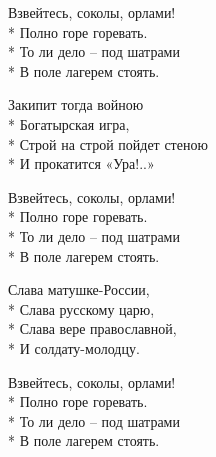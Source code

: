 \begin{minipage}{\linewidth}
\hspace*{1.5em}Взвейтесь, соколы, орлами!\\*
\hspace*{1.5em}Полно горе горевать.\\*
\hspace*{1.5em}То ли дело – под шатрами\\*
\hspace*{1.5em}В поле лагерем стоять.\\
\end{minipage}\par\medskip\nobreak

\medskip

\begin{minipage}{\linewidth}
Закипит тогда войною\\*
Богатырская игра,\\*
Строй на строй пойдет стеною\\*
И прокатится «Ура!..»\\
\end{minipage}\par\medskip\nobreak

\medskip

\begin{minipage}{\linewidth}
\hspace*{1.5em}Взвейтесь, соколы, орлами!\\*
\hspace*{1.5em}Полно горе горевать.\\*
\hspace*{1.5em}То ли дело – под шатрами\\*
\hspace*{1.5em}В поле лагерем стоять.\\
\end{minipage}\par\medskip\nobreak

\medskip

\begin{minipage}{\linewidth}
Слава матушке-России,\\*
Слава русскому царю,\\*
Слава вере православной,\\*
И солдату-молодцу.\\
\end{minipage}\par\medskip\nobreak

\medskip

\begin{minipage}{\linewidth}
\hspace*{1.5em}Взвейтесь, соколы, орлами!\\*
\hspace*{1.5em}Полно горе горевать.\\*
\hspace*{1.5em}То ли дело – под шатрами\\*
\hspace*{1.5em}В поле лагерем стоять.\\
\end{minipage}

